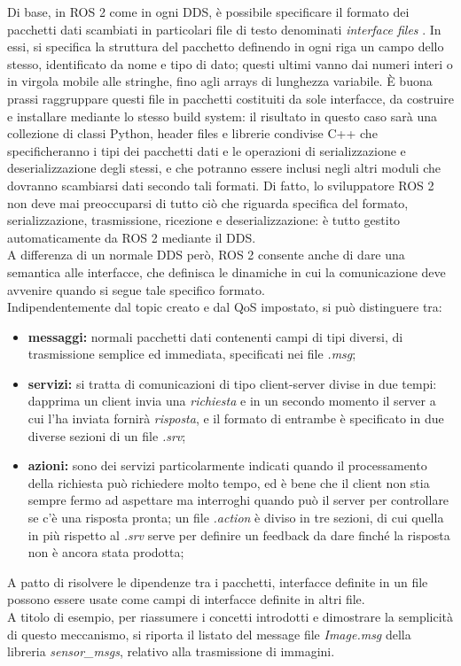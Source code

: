 \indent Di base, in ROS 2 come in ogni DDS, è possibile specificare il formato dei pacchetti dati scambiati in particolari file di testo denominati \emph{interface files} \cite{ros2_interface}. In essi, si specifica la struttura del pacchetto definendo in ogni riga un campo dello stesso, identificato da nome e tipo di dato; questi ultimi vanno dai numeri interi o in virgola mobile alle stringhe, fino agli arrays di lunghezza variabile. È buona prassi raggruppare questi file in pacchetti costituiti da sole interfacce, da costruire e installare mediante lo stesso build system: il risultato in questo caso sarà una collezione di classi Python, header files e librerie condivise C++ che specificheranno i tipi dei pacchetti dati e le operazioni di serializzazione e deserializzazione degli stessi, e che potranno essere inclusi negli altri moduli che dovranno scambiarsi dati secondo tali formati. Di fatto, lo sviluppatore ROS 2 non deve mai preoccuparsi di tutto ciò che riguarda specifica del formato, serializzazione, trasmissione, ricezione e deserializzazione: è tutto gestito automaticamente da ROS 2 mediante il DDS.\\
A differenza di un normale DDS però, ROS 2 consente anche di dare una semantica alle interfacce, che definisca le dinamiche in cui la comunicazione deve avvenire quando si segue tale specifico formato.\\
Indipendentemente dal topic creato e dal QoS impostato, si può distinguere tra:
\begin{itemize}
    \item \textbf{messaggi:} normali pacchetti dati contenenti campi di tipi diversi, di trasmissione semplice ed immediata, specificati nei file \emph{.msg};
    \item \textbf{servizi:} si tratta di comunicazioni di tipo client-server divise in due tempi: dapprima un client invia una \emph{richiesta} e in un secondo momento il server a cui l'ha inviata fornirà \emph{risposta}, e il formato di entrambe è specificato in due diverse sezioni di un file \emph{.srv};
    \item \textbf{azioni:} sono dei servizi particolarmente indicati quando il processamento della richiesta può richiedere molto tempo, ed è bene che il client non stia sempre fermo ad aspettare ma interroghi quando può il server per controllare se c'è una risposta pronta; un file \emph{.action} è diviso in tre sezioni, di cui quella in più rispetto al \emph{.srv} serve per definire un feedback da dare finché la risposta non è ancora stata prodotta;
\end{itemize}
A patto di risolvere le dipendenze tra i pacchetti, interfacce definite in un file possono essere usate come campi di interfacce definite in altri file.\\
A titolo di esempio, per riassumere i concetti introdotti e dimostrare la semplicità di questo meccanismo, si riporta il listato del message file \emph{Image.msg} della libreria \emph{sensor\_msgs}, relativo alla trasmissione di immagini.
\newpage

